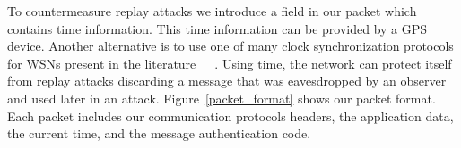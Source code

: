 
To countermeasure replay attacks we introduce a field in our packet which contains time information.
This time information can be provided by a GPS device. 
Another alternative is to use one of many clock synchronization protocols for WSNs present in the literature~\cite{Fontanelli:2009}~\cite{Fontanelli:2010}~\cite{Swain:2010}.
Using time, the network can protect itself from replay attacks discarding a message that was eavesdropped by an observer and used later in an attack.
Figure~\ref{packet_format} shows our packet format.
Each packet includes our communication protocols headers, the application data, the current time, and the message authentication code.

